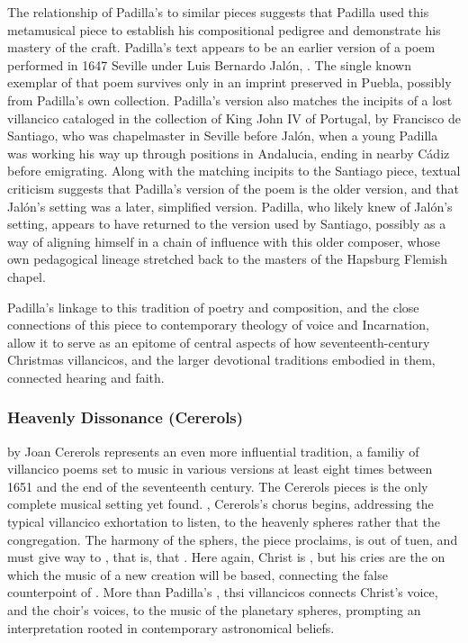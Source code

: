 \documentclass[tt]{vcbook-proposal}
\begin{document}
The relationship of Padilla's  to similar pieces suggests that Padilla used this metamusical piece to establish his compositional pedigree and demonstrate his mastery of the craft.
Padilla's text appears to be an earlier version of a poem performed in 1647 Seville under Luis Bernardo Jalón, .
The single known exemplar of that poem survives only in an imprint preserved in Puebla, possibly from Padilla's own collection.
Padilla's version also matches the incipits of a lost villancico cataloged in the collection of King John IV of Portugal, by Francisco de Santiago, who was chapelmaster in Seville before Jalón, when a young Padilla was working his way up through positions in Andalucia, ending in nearby Cádiz before emigrating.
Along with the matching incipits to the Santiago piece, textual criticism suggests that Padilla's version of the poem is the older version, and that Jalón's setting was a later, simplified version.
Padilla, who likely knew of Jalón's setting, appears to have returned to the version used by Santiago, possibly as a way of aligning himself in a chain of influence with this older composer, whose own pedagogical lineage stretched back to the masters of the Hapsburg Flemish chapel.

Padilla's linkage to this tradition of poetry and composition, and the close connections of this piece to contemporary theology of voice and Incarnation, allow it to serve as an epitome of central aspects of how seventeenth-century Christmas villancicos, and the larger devotional traditions embodied in them, connected hearing and faith.



\subsubsection{Heavenly Dissonance (Cererols)}

 by Joan Cererols represents an even more influential tradition, a familiy of villancico poems set to music in various versions at least eight times between 1651 and the end of the seventeenth century.
The Cererols pieces is the only complete musical setting yet found.
, Cererols's chorus begins, addressing the typical villancico exhortation to listen, to the heavenly spheres rather that the congregation. 
The harmony of the sphers, the piece proclaims, is out of tuen, and must give way to , that is,  that .
Here again, Christ is , but his cries are the  on which the music of a new creation will be based, connecting the false counterpoint of .
More than Padilla's , thsi villancicos connects Christ's voice, and the choir's voices, to the music of the planetary spheres, prompting an interpretation rooted in contemporary astronomical beliefs.
\end{document}

